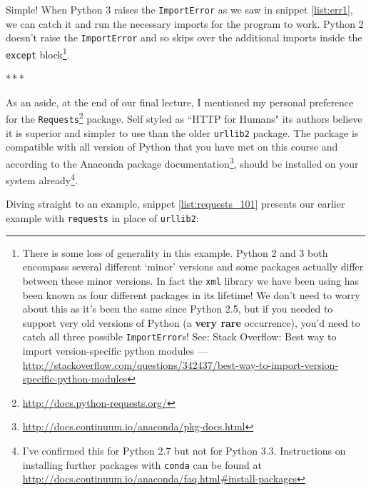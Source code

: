 \documentclass[a4paper]{article}
\newcommand{\asterism}{\bigskip\par\centerline{*\,*\,*}\medskip\par}%
\begin{document}
Simple! When Python 3 raises the \texttt{ImportError} as we saw in snippet \ref{list:err1},
we can catch it and run the necessary imports for the program to work. Python 2
doesn't raise the \texttt{ImportError} and so skips over the additional imports
inside the \texttt{except} block\footnote{There is some loss of generality in this example.
Python 2 and 3 both encompass several different `minor' versions and some packages
actually differ between these minor versions. In fact the \texttt{xml} library we
have been using has been known as four different packages in its lifetime! We don't
need to worry about this as it's been the same since Python 2.5, but if you needed
to support very old versions of Python (a \textbf{very rare} occurrence), you'd need to catch all three possible \texttt{ImportError}s! See: Stack Overflow: Best way to import version-specific python modules ---
{\href{http://stackoverflow.com/questions/342437/best-way-to-import-version-specific-python-modules}{http://stackoverflow.com/questions/342437/best-way-to-import-version-specific-python-modules}}}.

\pagebreak
\asterism

As an aside, at the end of our final lecture, I mentioned my personal preference
for the \texttt{Requests}\footnote{{\href{http://docs.python-requests.org/}{http://docs.python-requests.org/}}} package. Self styled as ``HTTP for Humans" its authors
believe it is superior and simpler to use than the older \texttt{urllib2} package.
The package is compatible with all version of Python that you have met on this course
and according to the Anaconda package documentation\footnote{{\href{http://docs.continuum.io/anaconda/pkg-docs.html}{http://docs.continuum.io/anaconda/pkg-docs.html}}},
should be installed on your system already\footnote{I've confirmed this for Python 2.7
but not for Python 3.3. Instructions on installing further packages with \texttt{conda}
can be found at {\href{http://docs.continuum.io/anaconda/faq.html\#install-packages}{http://docs.continuum.io/anaconda/faq.html\#install-packages}}}.

Diving straight to an example, snippet \ref{list:requests_101} presents our earlier
example with \texttt{requests} in place of \texttt{urllib2}:
\end{document}
